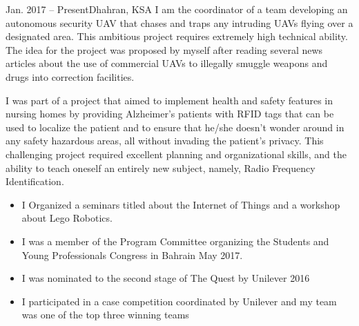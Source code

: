 \documentclass[10pt,a4paper]{altacv}
\begin{document}

{Jan. 2017 -- Present}{Dhahran, KSA}
I am the coordinator of a team developing an autonomous security UAV that chases and traps any intruding UAVs flying over a designated area. This ambitious project requires extremely high technical ability. The idea for the project was proposed by myself after reading several news articles about the use of commercial UAVs to illegally smuggle weapons and drugs into correction facilities.


\divider


I was part of a project that aimed to implement health and safety features in nursing homes by providing Alzheimer's patients with RFID tags that can be used to localize the patient and to ensure that he/she doesn't wonder around in any safety hazardous areas, all without invading the patient's privacy. This challenging project required excellent planning and organizational skills, and the ability to teach oneself an entirely new subject, namely, Radio Frequency Identification.







\clearpage
{}

\begin{itemize}
\item I Organized a seminars titled  about the Internet of Things and a workshop about Lego Robotics.
\item I was a member of the Program Committee organizing the Students and Young Professionals Congress in Bahrain May 2017.
\end{itemize}

\divider

\begin{itemize}
\item I was nominated to the second stage of The Quest by Unilever 2016 
\item I participated in a case competition coordinated by Unilever and my team was one of the top three winning teams
\end{itemize}
\end{document}
